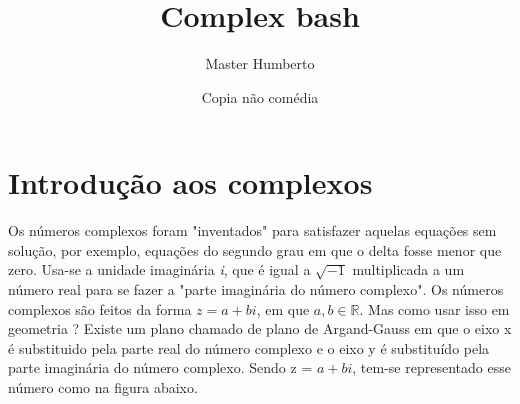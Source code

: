\documentclass{article}
\title{Complex bash}
\author{Master Humberto}
\date{Copia não comédia}
\begin{document}
\maketitle
\tableofcontents

\section{Introdução aos complexos}

Os números complexos foram "inventados" para satisfazer aquelas equações sem solução, por exemplo, equações do segundo grau em que o delta fosse menor que zero. Usa-se a unidade imaginária \textit{i}, que é igual a $\sqrt{-1}$ multiplicada a um número real para se fazer a "parte imaginária do número complexo". Os números complexos são feitos da forma $z = a + bi$, em que $a,b \in \mathbb{R}$. Mas como usar isso em  geometria ? Existe um plano chamado de plano de Argand-Gauss em que o eixo x é substituido pela parte real do número complexo e o eixo y é substituído pela parte imaginária  do número complexo. Sendo z = $a + bi$, tem-se representado esse número como na figura abaixo.
\begin{center}
\end{center}
\end{document}
